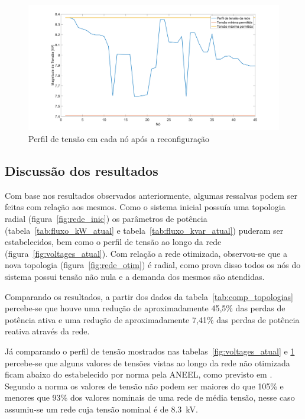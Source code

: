 





\begin{figure}[H]
    \centering
    \includegraphics[width=\textwidth]{01_img/rede_otim.png}
    \caption{Perfil de tensão em cada nó após a reconfiguração}
    \label{fig:voltages_otim}
\end{figure}



\subsection{Discussão dos resultados}

Com base nos resultados observados anteriormente, algumas ressalvas podem ser feitas com relação aos mesmos. Como o sistema inicial possuía uma topologia radial (figura~\ref{fig:rede_inic}) os parâmetros de potência (tabela~\ref{tab:fluxo_kW_atual} e tabela~\ref{tab:fluxo_kvar_atual}) puderam ser estabelecidos, bem como o perfil de tensão ao longo da rede (figura~\ref{fig:voltages_atual}).
Com relação a rede otimizada, observou-se que a nova topologia (figura~\ref{fig:rede_otim}) é radial, como prova disso todos os nós do sistema possui tensão não nula e a demanda dos mesmos são atendidas.

Comparando os resultados, a partir dos dados da tabela~\ref{tab:comp_topologias} percebe-se que houve uma redução de aproximadamente 45,5\% das perdas de potência ativa e uma redução de aproximadamente 7,41\% das perdas de potência reativa através da rede. 

Já comparando o perfil de tensão mostrados nas tabelas~\ref{fig:voltages_atual} e \ref{fig:voltages_otim} percebe-se que alguns valores de tensões vistas ao longo da rede não otimizada ficam abaixo do estabelecido por norma pela ANEEL, como previsto em \cite{AgenciaNacionaldeEnergiaEletrica2018ModuloVigencia}. Segundo a norma os valores de tensão não podem ser maiores do que 105\% e menores que 93\% dos valores nominais de uma rede de média tensão, nesse caso assumiu-se um rede cuja tensão nominal é de \SI{8,3}{\kilo\volt}. 
